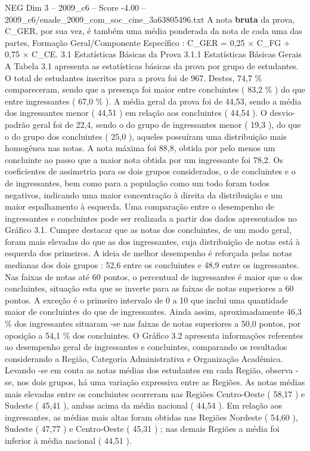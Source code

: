 \begin{textsample}{NEG Dim 3 – 2009\_c6 – Score -4.00 – 2009\_c6/enade\_2009\_com\_soc\_cine\_3a63805496.txt}
A nota \textbf{bruta} da prova, C\_GER, por sua vez, é também uma média ponderada da nota de cada uma das partes, Formação Geral/Componente Específico : C\_GER = 0,25 × C\_FG + 0,75 × C\_CE. 3.1 Estatísticas Básicas da Prova 3.1.1 Estatísticas Básicas Gerais A Tabela 3.1 apresenta as estatísticas básicas da prova por grupo de estudantes.
O total de estudantes inscritos para a prova foi de 967.
Destes, 74,7 \% compareceram, sendo que a presença foi maior entre concluintes ( 83,2 \% ) do que entre ingressantes ( 67,0 \% ).
A média geral da prova foi de 44,53, sendo a média dos ingressantes menor ( 44,51 ) em relação aos concluintes ( 44,54 ).
O desvio-padrão geral foi de 22,4, sendo o do grupo de ingressantes menor ( 19,3 ), do que o do grupo dos concluintes ( 25,0 ), aqueles possuíram uma distribuição mais homogênea nas notas.
A nota máxima foi 88,8, obtida por pelo menos um concluinte ao passo que a maior nota obtida por um ingressante foi 78,2.
Os coeficientes de assimetria para os dois grupos considerados, o de concluintes e o de ingressantes, bem como para a população como um todo foram todos negativos, indicando uma maior concentração à direita da distribuição e um maior espalhamento à esquerda.
Uma comparação entre o desempenho de ingressantes e concluintes pode ser realizada a partir dos dados apresentados no Gráfico 3.1.
Cumpre destacar que as notas dos concluintes, de um modo geral, foram mais elevadas do que as dos ingressantes, cuja distribuição de notas está à esquerda dos primeiros.
A ideia de melhor desempenho é reforçada pelas notas medianas dos dois grupos : 52,6 entre os concluintes e 48,9 entre os ingressantes.
Nas faixas de notas até 60 pontos, o percentual de ingressantes é maior que o dos concluintes, situação esta que se inverte para as faixas de notas superiores a 60 pontos.
A exceção é o primeiro intervalo de 0 a 10 que inclui uma quantidade maior de concluintes do que de ingressantes.
Ainda assim, aproximadamente 46,3 \% dos ingressantes situaram -se nas faixas de notas superiores a 50,0 pontos, por oposição a 54,1 \% dos concluintes.
O Gráfico 3.2 apresenta informações referentes ao desempenho geral de ingressantes e concluintes, comparando os resultados considerando a Região, Categoria Administrativa e Organização Acadêmica.
Levando -se em conta as notas médias dos estudantes em cada Região, observa -se, nos dois grupos, há uma variação expressiva entre as Regiões.
As notas médias mais elevadas entre os concluintes ocorreram nas Regiões Centro-Oeste ( 58,17 ) e Sudeste ( 45,41 ), ambas acima da média nacional ( 44,54 ).
Em relação aos ingressantes, as médias mais altas foram obtidas nas Regiões Nordeste ( 54,60 ), Sudeste ( 47,77 ) e Centro-Oeste ( 45,31 ) ; nas demais Regiões a média foi inferior à média nacional ( 44,51 ).

\end{textsample}
